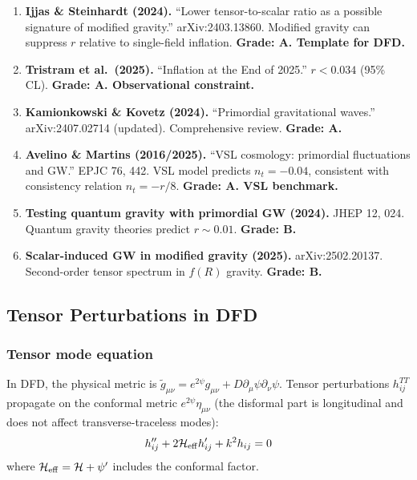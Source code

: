 \documentclass[11pt,a4paper]{article}
\begin{document}
\begin{enumerate}
\item \textbf{Ijjas \& Steinhardt (2024).} ``Lower tensor-to-scalar ratio as a possible signature of modified gravity.'' arXiv:2403.13860. Modified gravity can suppress $r$ relative to single-field inflation. \textbf{Grade: A. Template for DFD.}

\item \textbf{Tristram et al.\ (2025).} ``Inflation at the End of 2025.'' $r < 0.034$ (95\% CL). \textbf{Grade: A. Observational constraint.}

\item \textbf{Kamionkowski \& Kovetz (2024).} ``Primordial gravitational waves.'' arXiv:2407.02714 (updated). Comprehensive review. \textbf{Grade: A.}

\item \textbf{Avelino \& Martins (2016/2025).} ``VSL cosmology: primordial fluctuations and GW.'' EPJC 76, 442. VSL model predicts $n_t = -0.04$, consistent with consistency relation $n_t = -r/8$. \textbf{Grade: A. VSL benchmark.}

\item \textbf{Testing quantum gravity with primordial GW (2024).} JHEP 12, 024. Quantum gravity theories predict $r \sim 0.01$. \textbf{Grade: B.}

\item \textbf{Scalar-induced GW in modified gravity (2025).} arXiv:2502.20137. Second-order tensor spectrum in $f(R)$ gravity. \textbf{Grade: B.}
\end{enumerate}

\subsection{Tensor Perturbations in DFD}

\subsubsection{Tensor mode equation}

In DFD, the physical metric is $\tilde{g}_{\mu\nu} = e^{2\psi}g_{\mu\nu} + D\partial_\mu\psi\partial_\nu\psi$. Tensor perturbations $h_{ij}^{TT}$ propagate on the conformal metric $e^{2\psi}\eta_{\mu\nu}$ (the disformal part is longitudinal and does not affect transverse-traceless modes):
\begin{equation}
h_{ij}'' + 2\mathcal{H}_{\rm eff}h_{ij}' + k^2 h_{ij} = 0
\end{equation}
where $\mathcal{H}_{\rm eff} = \mathcal{H} + \psi'$ includes the conformal factor.
\end{document}
